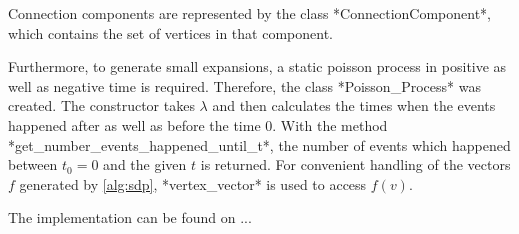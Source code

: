 Connection components are represented by the class *ConnectionComponent*, which contains the set of vertices in that component.

Furthermore, to generate small expansions, a static poisson process in positive as well as negative time is required. Therefore, the class *Poisson\_Process* was created. The constructor takes $\lambda$ and then calculates the times when the events happened after as well as before the time 0. With the method *get\_number\_events\_happened\_until\_t*, the number of events which happened between $t_0=0$ and the given $t$ is returned. 
For convenient handling of the vectors $f$ generated by \cref{alg:sdp}, *vertex\_vector* is used to access $f(v)$.


The implementation can be found on ... %
